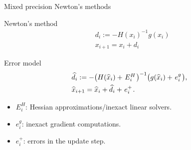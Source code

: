 \documentclass{beamer}
\begin{document}
\begin{frame}{Mixed precision Newton's methods}

\begin{tcolorbox}{Newton's method}
  \begin{align*}
      &d_i:= -H(x_i)^{-1}g(x_i)\\
      &x_{i+1}=x_i+d_i
  \end{align*}
\end{tcolorbox}

\begin{tcolorbox}{Error model}
  \begin{align*}
      &\widehat{d}_i := - \big(H(\widehat{x}_i) + \tikz[remember picture, baseline=(EH.base)]{\node[inner sep=1pt] (EH) {$E^H_i$};}\big)^{-1}\big(g(\widehat{x}_i) + \tikz[remember picture, baseline=(Eg.base)]{\node[inner sep=1pt] (Eg) {$e^g_i$};}\big), \\
      &\widehat{x}_{i+1} =  \widehat{x}_i + \widehat{d}_i + \tikz[remember picture, baseline=(Ep.base)]{\node[inner sep=1pt] (Ep) {$e^+_i$};}.
  \end{align*}

  \begin{itemize}
    \item<2-> \textcolor{myblue!70!black}{$E^H_i$: Hessian approximations/inexact linear solvers.}
    \item<3-> \textcolor{gray!70!black}{$e^g_i$: inexact gradient computations.}
    \item<4-> \textcolor{myyel!70!black}{$e^+_i$: errors in the update step.}
  \end{itemize}

  \end{tcolorbox}
\end{frame}
\end{document}
